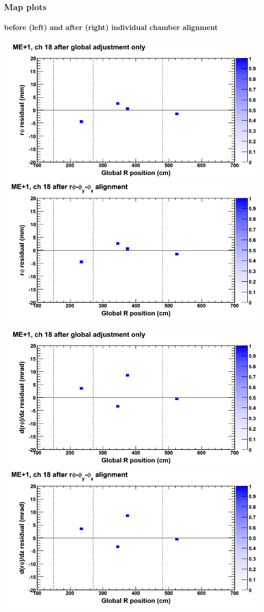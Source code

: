 \documentclass[compress]{beamer}
\begin{document}
\begin{frame}
\frametitle{Map plots}
\framesubtitle{before (left) and after (right) individual chamber alignment}
\includegraphics[width=0.5\linewidth]{ringmapplots_3dof/before_CSCvsr_mep1ch18_x.png} \includegraphics[width=0.5\linewidth]{ringmapplots_3dof/after_CSCvsr_mep1ch18_x.png}

\includegraphics[width=0.5\linewidth]{ringmapplots_3dof/before_CSCvsr_mep1ch18_dxdz.png} \includegraphics[width=0.5\linewidth]{ringmapplots_3dof/after_CSCvsr_mep1ch18_dxdz.png}
\end{frame}
\end{document}
